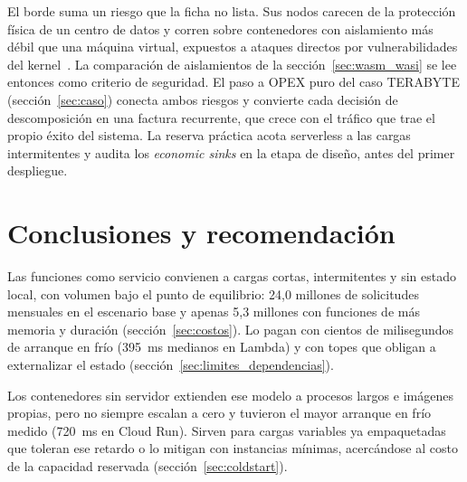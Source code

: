 \documentclass[12pt, letterpaper, table, xcdraw]{inf-pucv}
\begin{document}
El borde suma un riesgo que la ficha no lista. Sus nodos carecen de la protección física de un centro de datos y corren sobre contenedores con aislamiento más débil que una máquina virtual, expuestos a ataques directos por vulnerabilidades del kernel~\parencite{xie2021}. La comparación de aislamientos de la sección~\ref{sec:wasm_wasi} se lee entonces como criterio de seguridad. El paso a OPEX puro del caso TERABYTE (sección~\ref{sec:caso}) conecta ambos riesgos y convierte cada decisión de descomposición en una factura recurrente, que crece con el tráfico que trae el propio éxito del sistema. La reserva práctica acota serverless a las cargas intermitentes y audita los \emph{economic sinks} en la etapa de diseño, antes del primer despliegue.





{}
\section*{Conclusiones y recomendación}


Las funciones como servicio convienen a cargas cortas, intermitentes y sin estado local, con volumen bajo el punto de equilibrio: 24,0 millones de solicitudes mensuales en el escenario base y apenas 5,3 millones con funciones de más memoria y duración (sección~\ref{sec:costos}). Lo pagan con cientos de milisegundos de arranque en frío (395~ms medianos en Lambda) y con topes que obligan a externalizar el estado (sección~\ref{sec:limites_dependencias}).

Los contenedores sin servidor extienden ese modelo a procesos largos e imágenes propias, pero no siempre escalan a cero y tuvieron el mayor arranque en frío medido (720~ms en Cloud Run). Sirven para cargas variables ya empaquetadas que toleran ese retardo o lo mitigan con instancias mínimas, acercándose al costo de la capacidad reservada (sección~\ref{sec:coldstart}).
\end{document}
